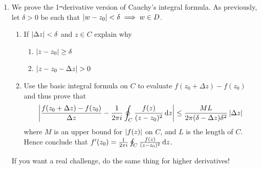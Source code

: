 \begin{exercises*}
\begin{enumerate}
  
	\item We prove the 1\st\ derivative version of Cauchy's integral formula. As previously, let $\delta>0$ be such that $\left| w-z_0\right|<\delta\implies w\in D$.
	\begin{enumerate}
	  \item If $\left| \Delta z\right|<\delta$ and $z\in C$ explain why
	  \begin{enumerate}
	    \item $\left| z-z_0\right|\ge \delta$
	    \item $\nm{z-z_0-\Delta z}>0$ 
	  \end{enumerate}
	  \item Use the basic integral formula on $C$ to evaluate $f(z_0+\Delta z)-f(z_0)$ and thus prove that
	  \[\left| \frac{f(z_0+\Delta z)-f(z_0)}{\Delta z}-\frac 1{2\pi i}\oint_C\frac{f(z)}{(z-z_0)^2}\,{\mathrm{d} z}\right| \le \frac{ML}{2\pi(\delta-\Delta z)\delta^2}\left| \Delta z\right|\]
	  where $M$ is an upper bound for $\left| f(z)\right|$ on $C$, and $L$ is the length of $C$. Hence conclude that $f'(z_0)=\frac 1{2\pi i}\oint_C\frac{f(z)}{(z-z_0)^2}\,{\mathrm{d} z}$.
	\end{enumerate}
	If you want a real challenge, do the same thing for higher derivatives!
	
	
	  
\end{enumerate}
\end{exercises*}
  

